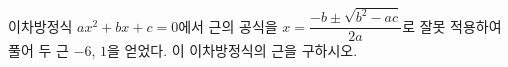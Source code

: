 이차방정식 $ax^2+bx+c=0$에서 근의 공식을 $x=\dfrac{-b\pm\sqrt{b^2-ac}}{2a}$로 잘못 적용하여 풀어 두 근 $-6$, $1$을 얻었다. 이 이차방정식의 근을 구하시오. 
